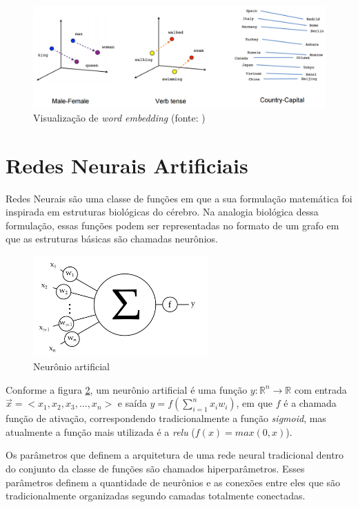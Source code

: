 \begin{figure}[!ht]
	\centering
	\includegraphics[width=\textwidth]{figures/Word-Vectors.png}
	\caption{Visualização de \textit{word embedding} (fonte: \cite{TensorflowWord2Vec})}
	\label{fig:wordembedding}
\end{figure}

\section{Redes Neurais Artificiais}

Redes Neurais são uma classe de funções em que a sua formulação matemática foi inspirada em estruturas biológicas do cérebro. Na analogia biológica dessa formulação, essas funções podem ser representadas no formato de um grafo em que as estruturas básicas são chamadas neurônios.

\begin{figure}[!ht]
	\centering
	\includegraphics[width=0.6\textwidth]{figures/neuron.png}
	\caption{Neurônio artificial}
	\label{fig:neuron}
\end{figure}

Conforme a figura \ref{fig:neuron}, um neurônio artificial é uma função $y:\mathbb R^n \rightarrow \mathbb R$ com entrada $\vec x = <x_1,x_2,x_3,\dots,x_n>$ e saída $y = f(\sum\limits_{i=1}^n x_iw_i)$, em que $f$ é a chamada função de ativação, correspondendo tradicionalmente a função \textit{sigmoid}, mas atualmente a função mais utilizada é a \textit{relu} ($f(x) = max(0, x)$).

Os parâmetros que definem a arquitetura de uma rede neural tradicional dentro do conjunto da classe de funções são chamados hiperparâmetros. Esses parâmetros definem a quantidade de neurônios e as conexões entre eles que são tradicionalmente organizadas segundo camadas totalmente conectadas.


